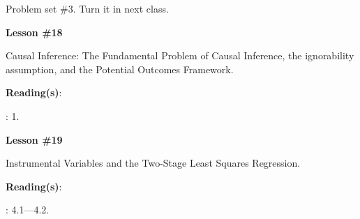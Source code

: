 \documentclass[letterpaper]{article}
\renewenvironment{itemize}{
  \begin{list}{}{
    \setlength{\leftmargin}{1.5em}
  }
}{
  \end{list}
}
\begin{document}
\begin{enumerate}

\item[{\color{red}\Pointinghand}] Problem set \#3. Turn it in next class.


  \item {}


      \begin{itemize} 
        \item[$\bullet$] {\bf Lesson \#18}
          \begin{itemize} 
            \item[$\circ$] Causal Inference: The Fundamental Problem of Causal Inference, the ignorability assumption, and the Potential Outcomes Framework.
            \item[$\circ$] {\bf Reading(s)}: 
              \begin{itemize}
                \item[$\diamond$] \textcite{Imbens2015}: 1.
              \end{itemize}
          \end{itemize}
      \end{itemize}





      \begin{itemize} 
        \item[$\bullet$] {\bf Lesson \#19}
          \begin{itemize} 
            \item[$\circ$] Instrumental Variables and the Two-Stage Least Squares Regression.
            \item[$\circ$] {\bf Reading(s)}: 
              \begin{itemize}
                \item[$\diamond$] \textcite{Angrist2009}: 4.1---4.2.
              \end{itemize}
          \end{itemize}
      \end{itemize}



\end{enumerate}
\end{document}
